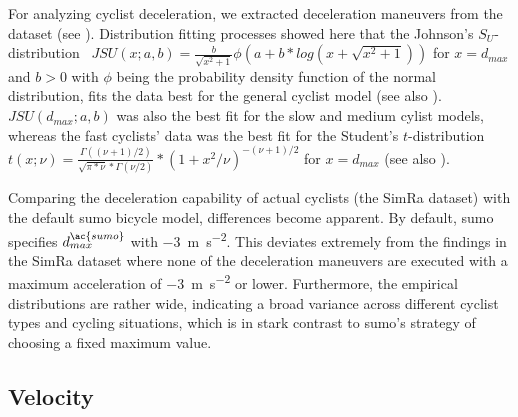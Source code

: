 For analyzing cyclist deceleration, we extracted deceleration maneuvers from the dataset (see ).
Distribution fitting processes showed here that the Johnson's $S_{U}$-distribution~\cite{johnson1949systems} $JSU(x; a,b) = \frac{b}{\sqrt{x^2+1}}\phi(a+b*log(x+\sqrt{x^2+1}))$ for $x=d_{max}$ and $b>0$ with $\phi$ being the probability density function of the normal distribution, fits the data best for the general cyclist model (see also ).
$JSU(d_{max}; a,b)$ was also the best fit for the slow and medium cylist models, whereas the fast cyclists' data was the best fit for the Student's $t$-distribution~\cite{student1908probable} $t(x; \nu)=\frac{\Gamma((\nu+1)/2)}{\sqrt{\pi*\nu}*\Gamma(\nu/2)}*(1+x^2/\nu)^{-(\nu+1)/2}$ for $x=d_{max}$ (see also ).

Comparing the deceleration capability of actual cyclists (the SimRa dataset) with the default \ac{sumo} bicycle model, differences become apparent.
By default, \ac{sumo} specifies $d_{max}^{\ac{sumo}}$ with \SI{-3}{\metre\per\square\second}.
This deviates extremely from the findings in the SimRa dataset where none of the deceleration maneuvers are executed with a maximum acceleration of \SI{-3}{\metre\per\square\second} or lower.
Furthermore, the empirical distributions are rather wide, indicating a broad variance across different cyclist types and cycling situations, which is in stark contrast to \ac{sumo}'s strategy of choosing a fixed maximum value.

\subsection{Velocity}
\label{subsec:velocity_preprocessing}

